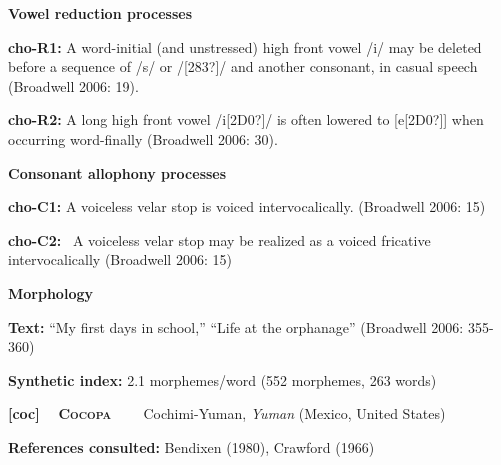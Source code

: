 \begin{styleBody}
\textbf{Vowel reduction processes}
\end{styleBody}

\begin{styleBody}
\textbf{cho-R1:} A word-initial (and unstressed) high front vowel /i/ may be deleted before a sequence of /s/ or /[283?]/ and another consonant, in casual speech (Broadwell 2006: 19).
\end{styleBody}

\begin{styleBody}
\textbf{cho-R2: }A long high front vowel /i[2D0?]/ is often lowered to [e[2D0?]] when occurring word-finally (Broadwell 2006: 30).
\end{styleBody}

\begin{styleBody}
\textbf{Consonant allophony processes}
\end{styleBody}

\begin{styleBody}
\textbf{cho-C1:} A voiceless velar stop is voiced intervocalically. (Broadwell 2006: 15)
\end{styleBody}

\begin{styleBody}
\textbf{cho-C2: }\ A voiceless velar stop may be realized as a voiced fricative intervocalically (Broadwell 2006: 15)
\end{styleBody}

\begin{styleBody}
\textbf{Morphology}
\end{styleBody}

\begin{styleBody}
\textbf{Text: }“My first days in school,” “Life at the orphanage” (Broadwell 2006: 355-360)
\end{styleBody}

\begin{styleBody}
\textbf{Synthetic index: }2.1 morphemes/word (552 morphemes, 263 words)
\end{styleBody}

\clearpage\begin{styleBody}
\textbf{[coc] }\ \ \textbf{\textsc{Cocopa}}\textbf{\ \ \ \ }Cochimi-Yuman, \textit{Yuman }(Mexico, United States)
\end{styleBody}

\begin{styleBody}
\textbf{References consulted: }Bendixen (1980), Crawford (1966)
\end{styleBody}


